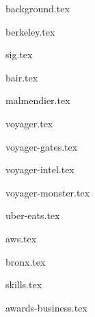 \documentclass[11pt]{article}
\begin{document}
{background.tex}


{berkeley.tex}


{sig.tex}

{bair.tex}

{malmendier.tex}

{voyager.tex}

{voyager-gates.tex}

{voyager-intel.tex}

{voyager-monster.tex}

{uber-eats.tex}

{aws.tex}

{bronx.tex}


{skills.tex}


{awards-business.tex}
\end{document}
